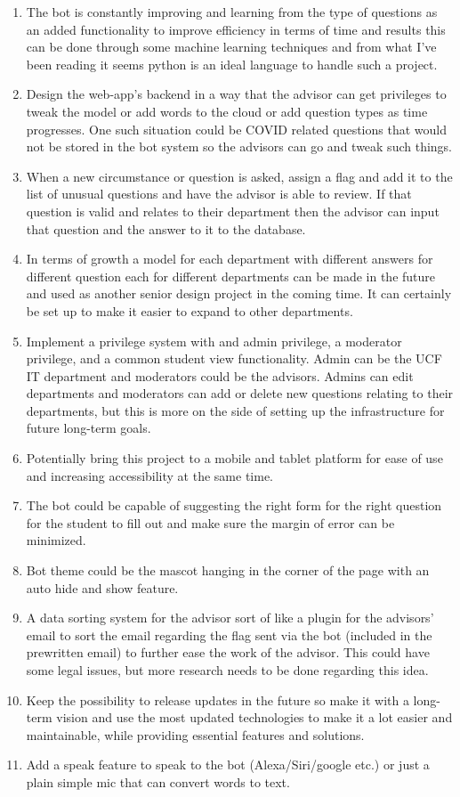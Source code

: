 \documentclass[titlepage, 12pt]{article}
\begin{document}
\begin{enumerate}
    \item The bot is constantly improving and learning from the type of questions as an added functionality to improve efficiency in terms of time and results this can be done through some machine learning techniques and from what I’ve been reading it seems python is an ideal language to handle such a project.
    \item Design the web-app’s backend in a way that the advisor can get privileges to tweak the model or add words to the cloud or add question types as time progresses. One such situation could be COVID related questions that would not be stored in the bot system so the advisors can go and tweak such things.
    \item When a new circumstance or question is asked, assign a flag and add it to the list of unusual questions and have the advisor is able to review. If that question is valid and relates to their department then the advisor can input that question and the answer to it to the database.
    \item In terms of growth a model for each department with different answers for different question each for different departments can be made in the future and used as another senior design project in the coming time. It can certainly be set up to make it easier to expand to other departments.
    \item Implement a privilege system with and admin privilege, a moderator privilege, and a common student view functionality. Admin can be the UCF IT department and moderators could be the advisors. Admins can edit departments and moderators can add or delete new questions relating to their departments, but this is more on the side of setting up the infrastructure for future long-term goals.
    \item Potentially bring this project to a mobile and tablet platform for ease of use and increasing accessibility at the same time.
    \item The bot could be capable of suggesting the right form for the right question for the student to fill out and make sure the margin of error can be minimized.
    \item Bot theme could be the mascot hanging in the corner of the page with an auto hide and show feature.
    \item A data sorting system for the advisor sort of like a plugin for the advisors’ email to sort the email regarding the flag sent via the bot (included in the prewritten email) to further ease the work of the advisor. This could have some legal issues, but more research needs to be done regarding this idea.
    \item Keep the possibility to release updates in the future so make it with a long-term vision and use the most updated technologies to make it a lot easier and maintainable, while providing essential features and solutions.
    \item Add a speak feature to speak to the bot (Alexa/Siri/google etc.) or just a plain simple mic that can convert words to text.
\end{enumerate}
\end{document}
